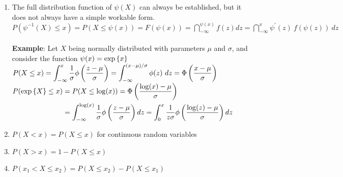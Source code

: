 \begin{enumerate}
    \item The full distribution function of $\psi(X)$ can always be established, but it does not always have a simple workable form.
    \hfill \cite{statistics/book/Statistics-for-Data-Scientists/Maurits-Kaptein}
    \\[0.2cm]
    $
        P(\psi^{-1}(X) \leq x)
        = P(X \leq \psi(x)) 
        = F(\psi(x))
        =\dint_{-\infty}^{\psi(x)} f(z) dz
        =\dint_{-\infty}^{x} \psi^{\prime}(z)\ f(\psi(z))\ dz
    $
    \hfill \cite{statistics/book/Statistics-for-Data-Scientists/Maurits-Kaptein}
    \\[0.2cm]
    \textbf{Example}: Let $X$ being normally distributed with parameters $\mu$ and $\sigma$, and consider the function $\psi(x) = \exp\left\{x\right\}$
    \hfill \cite{statistics/book/Statistics-for-Data-Scientists/Maurits-Kaptein}
    \\[0.2cm]
    $
        P(X \leq x)
        = \displaystyle\int_{-\infty}^{x} \dfrac{1}{\sigma} \phi\left(\dfrac{z - \mu}{\sigma}\right)
        = \displaystyle\int_{-\infty}^{(x - \mu)/\sigma} \phi(z)\ dz
        = \Phi\left(\dfrac{x - \mu}{\sigma}\right)
    $
    \hfill \cite{statistics/book/Statistics-for-Data-Scientists/Maurits-Kaptein}
    \\[0.2cm]
    $
        \begin{aligned}
            P(\exp\left\{X\right\} \leq x) 
                &= P(X \leq \log(x))
                = \Phi\left(\dfrac{\log(x) - \mu}{\sigma}\right) \\  
                &= \displaystyle\int_{-\infty}^{\log(x)} \dfrac{1}{\sigma} \phi\left(\dfrac{z - \mu}{\sigma}\right) dz
                = \displaystyle\int_{0}^{x} \dfrac{1}{z\sigma} \phi\left(\dfrac{\log(z) - \mu}{\sigma}\right) dz
        \end{aligned}
    $
    \hfill \cite{statistics/book/Statistics-for-Data-Scientists/Maurits-Kaptein}






    \item $P(X < x) = P(X \leq x)$ for continuous random variables

    \item $P(X > x) = 1 - P(X \leq x)$
    \hfill \cite{statistics/book/Statistics-for-Data-Scientists/Maurits-Kaptein}

    \item $P( x_1 < X \leq x_2) = P(X \leq x_2) - P(X \leq x_1)$
    \hfill \cite{statistics/book/Statistics-for-Data-Scientists/Maurits-Kaptein}
\end{enumerate}



